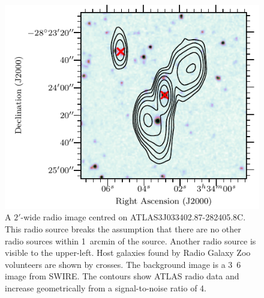 \documentclass[fleqn,usenatbib,usedcolumn]{mnras}
\newcommand{\edited}[1]{#1}
\begin{document}
    \begin{figure}
      \centering
      \includegraphics[width=\linewidth]{images/CI0077C1_fig.pdf}
      \caption{A $2'$-wide radio image centred on ATLAS3\textunderscore{}J033402.87-282405.8C.
        This radio source breaks the assumption that there are no other radio
        sources within 1~arcmin of the source. Another radio source is visible
        to the upper-left. Host galaxies found by Radio Galaxy Zoo volunteers
        are shown by crosses. \edited{The background image
        is a \unit{3.6}{\micro\meter} image from SWIRE. The contours show ATLAS radio
        data and increase geometrically from a signal-to-noise ratio of 4.}}
      \label{fig:broken-isolation}
    \end{figure}
\end{document}
